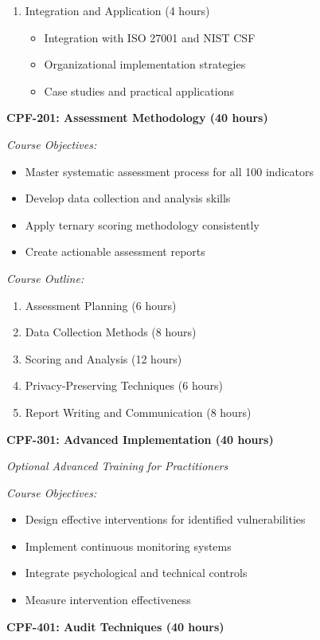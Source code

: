 \documentclass[11pt,a4paper]{article}
\begin{document}
\begin{enumerate}
\item Integration and Application (4 hours)
\begin{itemize}
\item Integration with ISO 27001 and NIST CSF
\item Organizational implementation strategies
\item Case studies and practical applications
\end{itemize}
\end{enumerate}

\textbf{CPF-201: Assessment Methodology (40 hours)}

\textit{Course Objectives:}
\begin{itemize}
\item Master systematic assessment process for all 100 indicators
\item Develop data collection and analysis skills
\item Apply ternary scoring methodology consistently
\item Create actionable assessment reports
\end{itemize}

\textit{Course Outline:}
\begin{enumerate}
\item Assessment Planning (6 hours)
\item Data Collection Methods (8 hours)
\item Scoring and Analysis (12 hours)
\item Privacy-Preserving Techniques (6 hours)
\item Report Writing and Communication (8 hours)
\end{enumerate}

\textbf{CPF-301: Advanced Implementation (40 hours)}

\textit{Optional Advanced Training for Practitioners}

\textit{Course Objectives:}
\begin{itemize}
\item Design effective interventions for identified vulnerabilities
\item Implement continuous monitoring systems
\item Integrate psychological and technical controls
\item Measure intervention effectiveness
\end{itemize}

\textbf{CPF-401: Audit Techniques (40 hours)}
\end{document}
